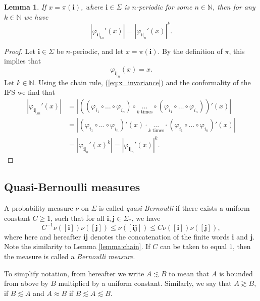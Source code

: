 \documentclass{PRM}
\newcommand{\field}[1]{\mathbb{#1}}
\newcommand{\N}{\field{N}}
\theoremstyle{plain}
\newtheorem{lemma}[thm]{Lemma}
\theoremstyle{definition}
\theoremstyle{remark}
\begin{document}
\begin{lemma}\label{lemma:power_equality}
If $x= \pi(\mathbf{i})$, where $\mathbf{i}\in\Sigma$ is $n$-periodic for some $n\in\N$, then for any $k\in\N$ we have
\begin{equation*}
    |\varphi_{\mathbf{i}|_{kn}}'(x)|=|\varphi_{\mathbf{i}|_{n}}'(x)|^k.
\end{equation*}
\end{lemma}
\begin{proof}
Let $\mathbf{i}\in \Sigma$ be $n$-periodic, and let $x=\pi(\mathbf{i})$. By the definition of $\pi$, this implies that 
\begin{equation}\label{eq:x_invariance}
    \varphi_{\mathbf{i}|_n}(x)=x.
\end{equation}
Let $k\in\N$. Using the chain rule, (\ref{eq:x_invariance}) and the conformality of the IFS we find that
\begin{align*}
    |\varphi_{\mathbf{i}|_{kn}}'(x)|&=|((\varphi_{i_1}\circ\ldots\circ\varphi_{i_n})\circ\underset{k\text{ times}}{\ldots}\circ(\varphi_{i_1}\circ\ldots\circ\varphi_{i_n}))'(x)|\\
    &=|(\varphi_{i_1}\circ\ldots\circ \varphi_{i_n})'(x)\cdot\underset{k\text{ times}}{\ldots}\cdot(\varphi_{i_1}\circ\ldots\circ \varphi_{i_n})'(x)|\\
    &=|\varphi_{\mathbf{i}|_n}'(x)^k|=|\varphi_{\mathbf{i}|_n}'(x)|^k.
\end{align*}
\end{proof}

\subsection{Quasi-Bernoulli measures}
A probability measure $\nu$ on $\Sigma$ is called \emph{quasi-Bernoulli} if there exists a uniform constant $C\geq 1$, such that for all $\mathbf{i},\mathbf{j}\in\Sigma_*$, we have
\begin{equation*}
    C^{-1}\nu([\mathbf{i}])\nu([\mathbf{j}])\leq \nu([\mathbf{i}\mathbf{j}])\leq C\nu([\mathbf{i}])\nu([\mathbf{j}]),
\end{equation*}
where here and hereafter $\mathbf{i}\mathbf{j}$ denotes the concatenation of the finite words $\mathbf{i}$ and $\mathbf{j}$. Note the similarity to Lemma \ref{lemma:chain}. If $C$ can be taken to equal $1$, then the measure is called a \emph{Bernoulli measure}.

To simplify notation, from hereafter we write $A\lesssim B$ to mean that $A$ is bounded from above by $B$ multiplied by a uniform constant. Similarly, we say that $A\gtrsim B$, if $B\lesssim A$ and $A\approx B$ if $B\lesssim A\lesssim B$.
\end{document}
